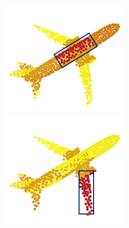 \documentclass[letterpaper]{article} %
\begin{document}
\begin{figure}[htbp]
\begin{center}
\begin{minipage}[b]{0.8\linewidth}
\begin{center}
\begin{minipage}[b]{0.12\linewidth}
\begin{center}
\includegraphics[width=1.0\linewidth]{images/atten_pic/airplane_attention_2.png}
\end{center}
\end{minipage}
\begin{minipage}[b]{0.12\linewidth}
\begin{center}
\includegraphics[width=1.0\linewidth]{images/atten_pic/airplane_attention_3.png}

\end{center}
\end{minipage}
\end{center}
\end{minipage}
\end{center}
\end{figure}
\end{document}
